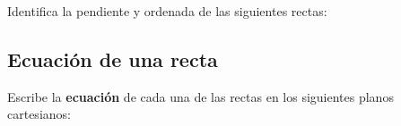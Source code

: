 \documentclass[12pt,addpoints]{evalua}
\begin{document}
\begin{questions}
     
      \question[8] Identifica la pendiente y ordenada de las siguientes rectas:
    
      \begin{multicols}{2}
      \end{multicols}


      
	\subsection{Ecuación de una recta}

    
      \question[4] Escribe la \textbf{ecuación} de cada una de las rectas en los siguientes planos cartesianos:
    
      \begin{multicols}{2}
            \begin{parts}

\end{parts}
\end{multicols}
\end{questions}
\end{document}

